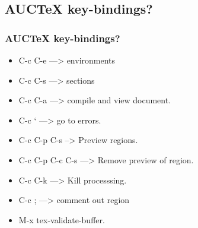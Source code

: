 \documentclass{beamer}
\begin{document}


\subsection{AUCTeX key-bindings?}
\begin{frame}
\frametitle{AUCTeX key-bindings?}
\begin{center}
\begin{itemize}[font=$\bullet$\scshape\bfseries]
\item C-c C-e ---> environments
\item C-c C-s ---> sections
\item C-c C-a ---> compile and view document.
\item C-c ` ---> go to errors.
\item C-c C-p C-s --> Preview regions.
\item C-c C-p C-c C-s ---> Remove preview of region.
\item C-c C-k ---> Kill processsing.
\item C-c ; ---> comment out region
\item M-x tex-validate-buffer.
\end{itemize}
\end{center}
\end{frame}
\note{}
\end{document}
